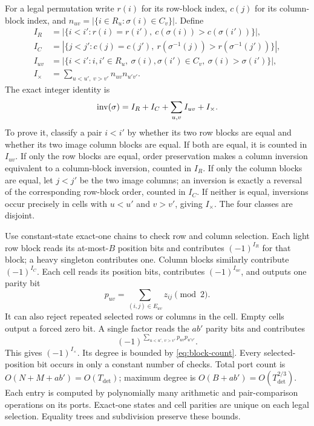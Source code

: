 For a legal permutation write $r(i)$ for its row-block index,
$c(j)$ for its column-block index, and
$n_{uv}=|\{i\in R_u:\sigma(i)\in C_v\}|$. Define
\begin{align*}
 I_R&=|\{i<i':r(i)=r(i'),\ c(\sigma(i))>c(\sigma(i'))\}|,\\
 I_C&=|\{j<j':c(j)=c(j'),\ r(\sigma^{-1}(j))>r(\sigma^{-1}(j'))\}|,\\
 I_{uv}&=|\{i<i':i,i'\in R_u,\ \sigma(i),\sigma(i')\in C_v,
                    \ \sigma(i)>\sigma(i')\}|,\\
 I_\times&=\sum_{u<u',\ v>v'}n_{uv}n_{u'v'}.
\end{align*}
The exact integer identity is
\begin{equation}\label{eq:sign-split}
 \operatorname{inv}(\sigma)=I_R+I_C+\sum_{u,v}I_{uv}+I_\times.
\end{equation}
To prove it, classify a pair $i<i'$ by whether its two row blocks
are equal and whether its two image column blocks are equal. If both
are equal, it is counted in $I_{uv}$. If only the row blocks are
equal, order preservation makes a column inversion equivalent to a
column-block inversion, counted in $I_R$. If only the column blocks
are equal, let $j<j'$ be the two image columns; an inversion is
exactly a reversal of the corresponding row-block order, counted in
$I_C$. If neither is equal, inversions occur precisely in cells with
$u<u'$ and $v>v'$, giving $I_\times$. The four classes are disjoint.

Use constant-state exact-one chains to check row and column selection.
Each light row block reads its at-most-$B$ position bits and contributes
$(-1)^{I_R}$ for that block; a heavy singleton contributes one.
Column blocks similarly contribute $(-1)^{I_C}$. Each cell reads its
position bits, contributes $(-1)^{I_{uv}}$, and outputs one parity bit
\[
 p_{uv}=\sum_{(i,j)\in E_{uv}}z_{ij}\pmod2.
\]
It can also reject repeated selected rows or columns in the cell.
Empty cells output a forced zero bit. A single factor reads the
$ab'$ parity bits and contributes
\begin{equation}\label{eq:cross-root}
 (-1)^{\sum_{u<u',\ v>v'}p_{uv}p_{u'v'}}.
\end{equation}
This gives $(-1)^{I_\times}$. Its degree is bounded by
\eqref{eq:block-count}. Every selected-position bit occurs in only a
constant number of checks. Total port count is
$O(N+M+ab')=O(T_{\mathrm{det}})$; maximum degree is
$O(B+ab')=O(T_{\mathrm{det}}^{2/3})$. Each entry is computed by
polynomially many arithmetic and pair-comparison operations on its
ports. Exact-one states and cell parities are unique on each legal
selection. Equality trees and subdivision preserve these bounds.

